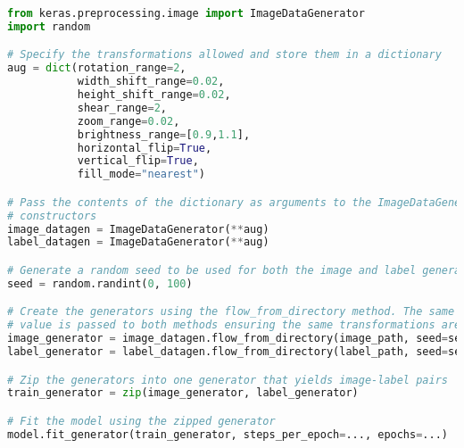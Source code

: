 \begin{lstlisting}[float={t},caption={A simplified example of online augmentation implemented using the \texttt{ImageDataGenerator} class.},label={lst:augment},language=Python,upquote=true]
from keras.preprocessing.image import ImageDataGenerator
import random

# Specify the transformations allowed and store them in a dictionary
aug = dict(rotation_range=2,
           width_shift_range=0.02,
           height_shift_range=0.02,
           shear_range=2,
           zoom_range=0.02,
           brightness_range=[0.9,1.1],
           horizontal_flip=True,
           vertical_flip=True,
           fill_mode="nearest")

# Pass the contents of the dictionary as arguments to the ImageDataGenerator
# constructors
image_datagen = ImageDataGenerator(**aug)
label_datagen = ImageDataGenerator(**aug)

# Generate a random seed to be used for both the image and label generators
seed = random.randint(0, 100)

# Create the generators using the flow_from_directory method. The same seed
# value is passed to both methods ensuring the same transformations are applied.
image_generator = image_datagen.flow_from_directory(image_path, seed=seed, ...)
label_generator = label_datagen.flow_from_directory(label_path, seed=seed, ...)

# Zip the generators into one generator that yields image-label pairs
train_generator = zip(image_generator, label_generator)

# Fit the model using the zipped generator
model.fit_generator(train_generator, steps_per_epoch=..., epochs=...)
\end{lstlisting}